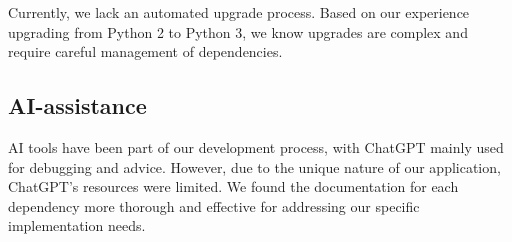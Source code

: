 Currently, we lack an automated upgrade process. Based on our experience upgrading from Python 2 to Python 3, we know upgrades are complex and require careful management of dependencies.

\subsection{AI-assistance}
AI tools have been part of our development process, with ChatGPT mainly used for debugging and advice. However, due to the unique nature of our application, ChatGPT's resources were limited. We found the documentation for each dependency more thorough and effective for addressing our specific implementation needs.
